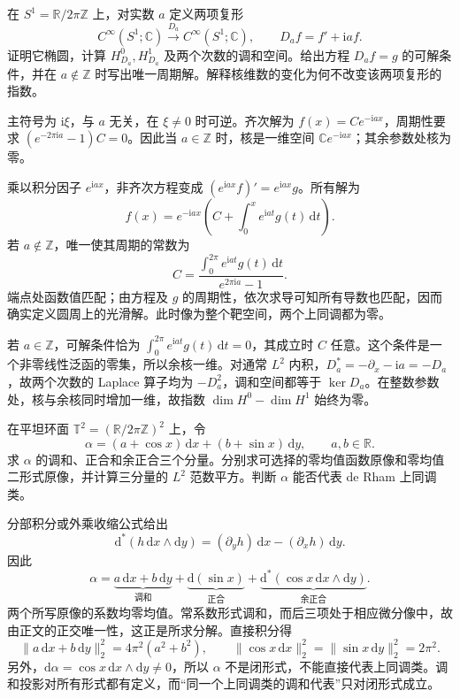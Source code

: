 \begin{exercise}\label{g3:ex:twisted-circle-complex}
	在 \(S^1=\mathbb R/2\pi\mathbb Z\) 上，对实数 \(a\) 定义两项复形
	\[
		C^\infty(S^1;\mathbb C)\xrightarrow{D_a}
		C^\infty(S^1;\mathbb C),\qquad D_af=f'+\mathrm i a f.
	\]
	证明它椭圆，计算 \(H_{D_a}^0,H_{D_a}^1\) 及两个次数的调和空间。给出方程 \(D_af=g\) 的可解条件，并在 \(a\notin\mathbb Z\) 时写出唯一周期解。解释核维数的变化为何不改变该两项复形的指数。
\end{exercise}
\begin{solution}
	主符号为 \(\mathrm i\xi\)，与 \(a\) 无关，在 \(\xi\ne0\) 时可逆。齐次解为 \(f(x)=Ce^{-\mathrm iax}\)，周期性要求
	\((e^{-2\pi\mathrm ia}-1)C=0\)。因此当 \(a\in\mathbb Z\) 时，核是一维空间 \(\mathbb C e^{-\mathrm iax}\)；其余参数处核为零。

	乘以积分因子 \(e^{\mathrm iax}\)，非齐次方程变成 \((e^{\mathrm iax}f)'=e^{\mathrm iax}g\)。所有解为
	\[
		f(x)=e^{-\mathrm iax}\left(C+\int_0^x e^{\mathrm iat}g(t)\,\mathrm dt\right).
	\]
	若 \(a\notin\mathbb Z\)，唯一使其周期的常数为
	\[
		C=\frac{\int_0^{2\pi}e^{\mathrm iat}g(t)\,\mathrm dt}
		{e^{2\pi\mathrm ia}-1}.
	\]
	端点处函数值匹配；由方程及 \(g\) 的周期性，依次求导可知所有导数也匹配，因而确实定义圆周上的光滑解。此时像为整个靶空间，两个上同调都为零。

	若 \(a\in\mathbb Z\)，可解条件恰为
	\(\int_0^{2\pi}e^{\mathrm iat}g(t)\,\mathrm dt=0\)，其成立时 \(C\) 任意。这个条件是一个非零线性泛函的零集，所以余核一维。对通常 \(L^2\) 内积，\(D_a^*=-\partial_x-\mathrm ia=-D_a\)，故两个次数的 Laplace 算子均为 \(-D_a^2\)，调和空间都等于 \(\ker D_a\)。在整数参数处，核与余核同时增加一维，故指数 \(\dim H^0-\dim H^1\) 始终为零。
\end{solution}

\begin{exercise}\label{g3:ex:flat-torus-explicit-hodge}
	在平坦环面 \(\mathbb T^2=(\mathbb R/2\pi\mathbb Z)^2\) 上，令
	\[
		\alpha=(a+\cos x)\,\mathrm dx+(b+\sin x)\,\mathrm dy,
		\qquad a,b\in\mathbb R.
	\]
	求 \(\alpha\) 的调和、正合和余正合三个分量。分别求可选择的零均值函数原像和零均值二形式原像，并计算三分量的 \(L^2\) 范数平方。判断 \(\alpha\) 能否代表 de Rham 上同调类。
\end{exercise}
\begin{solution}
	分部积分或外乘收缩公式给出
	\[
		\mathrm d^*(h\,\mathrm dx\wedge\mathrm dy)
		=(\partial_yh)\,\mathrm dx-(\partial_xh)\,\mathrm dy.
	\]
	因此
	\[
		\alpha=\underbrace{a\,\mathrm dx+b\,\mathrm dy}_{\text{调和}}
		+\underbrace{\mathrm d(\sin x)}_{\text{正合}}
		+\underbrace{\mathrm d^*(\cos x\,\mathrm dx\wedge\mathrm dy)}_{\text{余正合}}.
	\]
	两个所写原像的系数均零均值。常系数形式调和，而后三项处于相应微分像中，故由正文的正交唯一性，这正是所求分解。直接积分得
	\[
		\|a\,\mathrm dx+b\,\mathrm dy\|_2^2=4\pi^2(a^2+b^2),
		\qquad
		\|\cos x\,\mathrm dx\|_2^2
		=\|\sin x\,\mathrm dy\|_2^2=2\pi^2.
	\]
	另外，\(\mathrm d\alpha=\cos x\,\mathrm dx\wedge\mathrm dy\ne0\)，所以 \(\alpha\) 不是闭形式，不能直接代表上同调类。调和投影对所有形式都有定义，而“同一个上同调类的调和代表”只对闭形式成立。
\end{solution}

